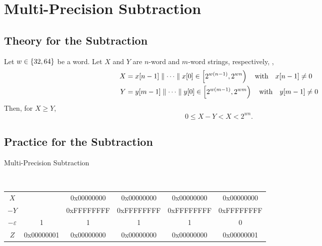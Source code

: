 \newpage
\section{Multi-Precision Subtraction}
\subsection{Theory for the Subtraction}
\begin{tcolorbox}[colframe=procolor,title={\color{white}\bf Upper and Lower Bound of Subtraction}]
\begin{proposition}
Let $w\in\set{32,64}$ be a word. Let $X$ and $Y$ are \(n\)-word and \(m\)-word strings, respectively, \ie, 
\begin{align*}
	X &= x[n-1]\adjacent\cdots\adjacent x[0]\in\intco{2^{w(n-1)},2^{wn}}\quad\text{with}\quad x[n-1]\neq 0\\
	Y &= y[m-1]\adjacent\cdots\adjacent y[0]\in\intco{2^{w(m-1)},2^{wm}}\quad\text{with}\quad y[m-1]\neq 0\\
\end{align*} Then, for $X\geq Y$, \[
0\leq X-Y<X<2^{wn}.
\]
\end{proposition}
\end{tcolorbox}

\subsection{Practice for the Subtraction}

\begin{algorithm}[H]
	\DontPrintSemicolon
	\caption{Multi-Precision Subtraction}
	\BlankLine
\end{algorithm}
\begin{example}
\ \begin{table}[h!]\centering\renewcommand{\arraystretch}{1.25}
{\ttfamily\begin{tabular*}{\textwidth}{@{\extracolsep{\fill}}cccccc}
$X$ & & 0x00000000 & 0x00000000 & 0x00000000 & 0x00000000 \\
$-Y$ &  & 0xFFFFFFFF & 0xFFFFFFFF & 0xFFFFFFFF & 0xFFFFFFFF \\
$-\varepsilon$ & 1 & 1 & 1 & 1 & 0 \\ \cline{2-6}
$Z$ & 0x00000001 & 0x00000000 & 0x00000000 & 0x00000000 & 0x00000001 \\
\end{tabular*}}
\end{table}
\end{example}
